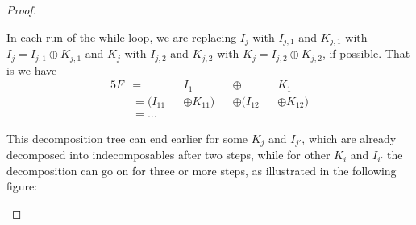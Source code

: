 \begin{proof}
\begin{subproof}
In each run of the while loop, we are replacing $I_{j}$ with $I_{j,1}$ and $K_{j,1}$ with $I_{j} = I_{j,1} \oplus K_{j,1}$ and
$K_{j}$ with $I_{j,2}$ and $K_{j,2}$ with $K_{j} = I_{j,2} \oplus K_{j,2}$, if possible. That is we have 
\begin{alignat*}{5}
F &=  &&I_{1} &&\oplus &&K_{1} \\
&= (I_{11} &&\oplus K_{11}) &&\oplus (I_{12} &&\oplus K_{12}) \\
&= \dots
\end{alignat*}

This decomposition tree can end earlier for some $K_{j}$ and $I_{j'}$, which are already decomposed into indecomposables after
two steps, while for other $K_{i}$ and $I_{i'}$ the decomposition can go on for three or more steps, as illustrated in the following figure:


\end{subproof}
\end{proof}
